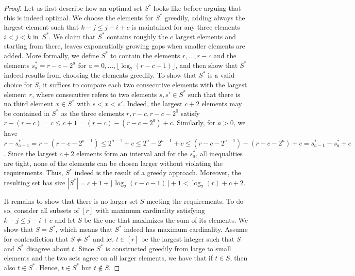 \documentclass[a4paper,english,cleveref,thm-restate]{lipics-v2021}
\begin{document}
\begin{proof}%
    Let us first describe how an optimal set $ S^* $ looks like before arguing that this is indeed optimal.
    We choose the elements for $ S^* $ greedily, adding always the largest element such that $ k - j \leq j - i + c $ is maintained for any three elements $ i < j < k $ in~$ S^* $.
    We claim that $ S^* $ contains roughly the $ c $ largest elements and starting from there, leaves exponentially growing gaps when smaller elements are added.
    More formally, we define $ S^* $ to contain the elements $ r, \dots, r - c $ and the elements $ s_a^* = r - c - 2^a $ for $ a = 0, \dots, \lfloor \log_2(r - c - 1) \rfloor $, and then show that $ S^* $ indeed results from choosing the elements greedily.
    To show that $ S^* $ is a valid choice for $ S $, it suffices to compare each two consecutive elements with the largest element $ r $, where consecutive refers to two elements $ s, s' \in S^* $ such that there is no third element $ x \in S^* $ with $ s < x < s' $.
    Indeed, the largest $ c + 2 $ elements may be contained in $ S^* $ as the three elements $ r, r-c, r - c - 2^0 $ satisfy $ r - (r - c) = c \leq c+1 = (r-c) - (r-c - 2^0) + c $.
    Similarly, for $ a > 0 $, we have 
    $ r - s_{a-1}^* 
    = r - (r - c - 2^{a-1}) 
    \leq 2^{a-1} + c
    \leq 2^{a} - 2^{a-1} + c
    \leq (r - c - 2^{a-1}) - (r - c - 2^{a}) + c
    = s_{a-1}^* - s_{a}^* + c$.
    Since the largest $ c + 2 $ elements form an interval and for the $ s_a^* $, all inequalities are tight, none of the elements can be chosen larger without violating the requirements.
    Thus, $ S^* $ indeed is the result of a greedy approach.
    Moreover, the resulting set has size $ |S^*| = c + 1 + \lfloor \log_2(r - c - 1) \rfloor + 1 < \log_2(r) + c + 2 $.

    It remains to show that there is no larger set $ S $ meeting the requirements. 
    To do so, consider all subsets of $ [r] $ with maximum cardinality satisfying $ k - j \leq j - i + c $ and let $ S $ be the one that maximizes the sum of its elements.
    We show that $ S = S^* $, which means that $ S^* $ indeed has maximum cardinality.
    Assume for contradiction that $S \neq S^*$ and let $ t \in [r] $ be the largest integer such that $ S $ and $ S^* $ disagree about $ t $. 
    Since $ S^* $ is constructed greedily from large to small elements and the two sets agree on all larger elements, we have that if $ t \in S $, then also $ t \in S^* $.
    Hence, $ t \in S^* $ but $ t \notin S $.
    

\end{proof}
\end{document}
